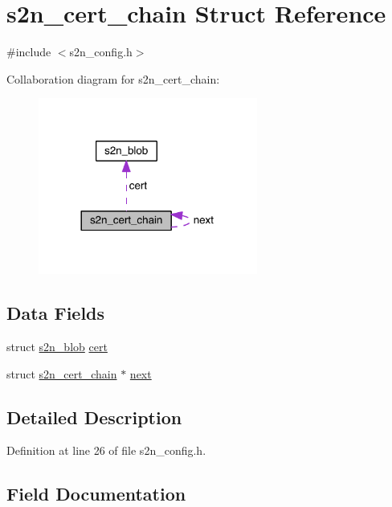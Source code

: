 \hypertarget{structs2n__cert__chain}{}\section{s2n\+\_\+cert\+\_\+chain Struct Reference}
\label{structs2n__cert__chain}


{\ttfamily \#include $<$s2n\+\_\+config.\+h$>$}



Collaboration diagram for s2n\+\_\+cert\+\_\+chain\+:\nopagebreak
\begin{figure}[H]
\begin{center}
\leavevmode
\includegraphics[width=204pt]{structs2n__cert__chain__coll__graph}
\end{center}
\end{figure}
\subsection*{Data Fields}
\begin{DoxyCompactItemize}
\item 
struct \hyperlink{structs2n__blob}{s2n\+\_\+blob} \hyperlink{structs2n__cert__chain_a875a2920fc4ec101b865d6006baa3b75}{cert}
\item 
struct \hyperlink{structs2n__cert__chain}{s2n\+\_\+cert\+\_\+chain} $\ast$ \hyperlink{structs2n__cert__chain_ae78fa31ff74363e3d7351dd25f5a0745}{next}
\end{DoxyCompactItemize}


\subsection{Detailed Description}


Definition at line 26 of file s2n\+\_\+config.\+h.



\subsection{Field Documentation}
